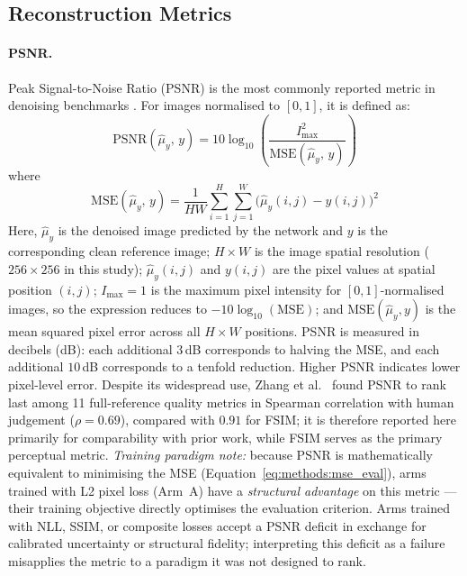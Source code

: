 \documentclass[12pt, a4paper, twoside, openright]{book}
\begin{document}
\subsection{Reconstruction Metrics}
\label{sec:methods:evaluation:recon}

\paragraph{PSNR.}
Peak Signal-to-Noise Ratio (PSNR) is the most commonly reported metric in denoising
benchmarks \cite{zhang_beyond_2017, liang_swinir_2021}. For images normalised to $[0,1]$,
it is defined as:
\begin{equation}
\label{eq:methods:psnr}
\mathrm{PSNR}(\hat{\mu}_y,\,y)
  = 10\log_{10}\!\left(\frac{I_{\max}^2}{\mathrm{MSE}(\hat{\mu}_y,\,y)}\right)
\end{equation}
where
\begin{equation}
\label{eq:methods:mse_eval}
\mathrm{MSE}(\hat{\mu}_y,\,y)
  = \frac{1}{HW}\sum_{i=1}^{H}\sum_{j=1}^{W}
    \bigl(\hat{\mu}_y(i,j) - y(i,j)\bigr)^2
\end{equation}
Here, $\hat{\mu}_y$ is the denoised image predicted by the network and $y$ is the
corresponding clean reference image; $H \times W$ is the image spatial resolution
($256 \times 256$ in this study); $\hat{\mu}_y(i,j)$ and $y(i,j)$ are the pixel values at
spatial position $(i,j)$; $I_{\max} = 1$ is the maximum pixel intensity for
$[0,1]$-normalised images, so the expression reduces to $-10\log_{10}(\mathrm{MSE})$;
and $\mathrm{MSE}(\hat{\mu}_y, y)$ is the mean squared pixel error across all $H \times W$
positions. PSNR is measured in decibels (dB): each additional $3$\,dB corresponds to
halving the MSE, and each additional $10$\,dB corresponds to a tenfold reduction. Higher
PSNR indicates lower pixel-level error. Despite its widespread use, Zhang et al.\
\cite{zhang_comprehensive_2012} found PSNR to rank last among 11 full-reference quality
metrics in Spearman correlation with human judgement ($\rho = 0.69$), compared with $0.91$
for FSIM; it is therefore reported here primarily for comparability with prior work, while
FSIM serves as the primary perceptual metric. \textit{Training paradigm note:} because PSNR is mathematically equivalent to minimising the MSE (Equation~\ref{eq:methods:mse_eval}), arms trained with L2 pixel loss (Arm~A) have a \emph{structural advantage} on this metric — their training objective directly optimises the evaluation criterion. Arms trained with NLL, SSIM, or composite losses accept a PSNR deficit in exchange for calibrated uncertainty or structural fidelity; interpreting this deficit as a failure misapplies the metric to a paradigm it was not designed to rank.
\end{document}
